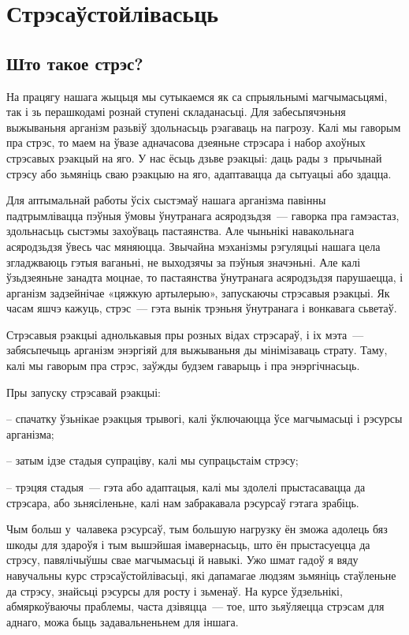\chapter{Стрэсаўстойлівасьць}

\section{Што такое стрэс?}

На працягу нашага жыцьця мы сутыкаемся як са спрыяльнымі магчымасьцямі, так і зь перашкодамі рознай ступені складанасьці. Для забесьпячэньня выжываньня арганізм разьвіў здольнасьць рэагаваць на пагрозу. Калі мы гаворым пра стрэс, то маем на ўвазе адначасова дзеяньне стрэсара і набор ахоўных стрэсавых рэакцый на яго. У нас ёсьць дзьве рэакцыі: даць рады з~прычынай стрэсу або зьмяніць сваю рэакцыю на яго, адаптавацца да сытуацыі або здацца.

Для аптымальнай работы ўсіх сыстэмаў нашага арганізма павінны падтрымлівацца пэўныя ўмовы ўнутранага асяродзьдзя~--- гаворка пра гамэастаз, здольнасьць сыстэмы захоўваць пастаянства. Але чыньнікі навакольнага асяродзьдзя ўвесь час мяняюцца. Звычайна мэханізмы рэгуляцыі нашага цела згладжваюць гэтыя ваганьні, не выходзячы за пэўныя значэньні. Але калі ўзьдзеяньне занадта моцнае, то пастаянства ўнутранага асяродзьдзя парушаецца, і арганізм задзейнічае «цяжкую артылерыю», запускаючы стрэсавыя рэакцыі. Як часам яшчэ кажуць, стрэс~--- гэта вынік трэньня ўнутранага і вонкавага сьветаў.

Стрэсавыя рэакцыі аднолькавыя пры розных відах стрэсараў, і іх мэта~--- забясьпечыць арганізм энэргіяй для выжываньня ды мінімізаваць страту. Таму, калі мы гаворым пра стрэс, заўжды будзем гаварыць і пра энэргічнасьць.

Пры запуску стрэсавай рэакцыі: 

– спачатку ўзьнікае рэакцыя трывогі, калі ўключаюцца ўсе магчымасьці і рэсурсы арганізма;

– затым ідзе стадыя супраціву, калі мы супрацьстаім стрэсу;

– трэцяя стадыя~--- гэта або адаптацыя, калі мы здолелі прыстасавацца да стрэсара, або зьнясіленьне, калі нам забракавала рэсурсаў гэтага зрабіць.

Чым больш у~чалавека рэсурсаў, тым большую нагрузку ён зможа адолець бяз шкоды для здароўя і тым вышэйшая імавернасьць, што ён прыстасуецца да стрэсу, павялічыўшы свае магчымасьці й навыкі. Ужо шмат гадоў я вяду навучальны курс стрэсаўстойлівасьці, які дапамагае людзям зьмяніць стаўленьне да стрэсу, знайсьці рэсурсы для росту і зьменаў. На курсе ўдзельнікі, абмяркоўваючы праблемы, часта дзівяцца~--- тое, што зьяўляецца стрэсам для аднаго, можа быць задавальненьнем для іншага.

